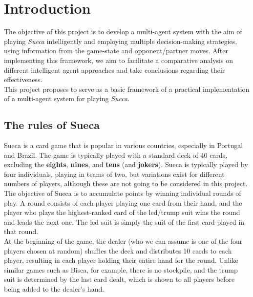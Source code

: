 \documentclass[sigconf]{acmart}
\begin{document}
\maketitle

\section{Introduction}
The objective of this project is to develop a multi-agent system with the aim of playing \textit{Sueca} intelligently and employing multiple decision-making  strategies, using information from the game-state and opponent/partner moves. After implementing this framework, we aim to facilitate a comparative analysis on different intelligent agent approaches and take conclusions regarding their effectiveness.\\

\noindent This project proposes to serve as a basic framework of a practical implementation of a multi-agent system for playing \textit{Sueca}.

\subsection{The rules of Sueca}
Sueca is a card game that is popular in various countries, especially in Portugal and Brazil. The game is typically played with a standard deck of 40 cards, excluding the \textbf{eights}, \textbf{nines}, and \textbf{tens} (and \textbf{jokers}). Sueca is typically played by four individuals, playing in teams of two, but variations exist for different numbers of players, although these are not going to be considered in this project.\\

\noindent The objective of Sueca is to accumulate points by winning individual rounds of play. A round consists of each player playing one card from their hand, and the player who plays the highest-ranked card of the led/trump suit wins the round and leads the next one. The led suit is simply the suit of the first card played in that round.\\

\noindent At the beginning of the game, the dealer (who we can assume is one of the four players chosen at random) shuffles the deck and distributes 10 cards to each player, resulting in each player holding their entire hand for the round. Unlike similar games such as Bisca, for example, there is no stockpile, and the trump suit is determined by the last card dealt, which is shown to all players before being added to the dealer's hand.\\
\end{document}
